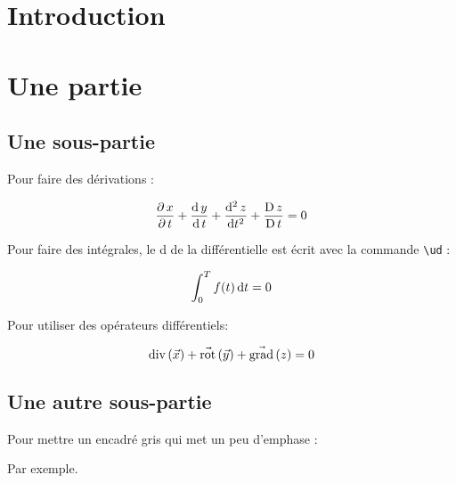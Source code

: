 \documentclass[a4paper,12pt,french]{article}
\begin{document}

\thispagestyle{empty}
\tableofcontents
\newpage


\section{Introduction}

\lipsum[1]





\newpage
\section{Une partie}
\subsection{Une sous-partie}


Pour faire des dérivations :

\[
    \dfrac{\partial\, x}{\partial\, t} + \dfrac{\mathrm{d}\, y}{\mathrm{d}\, t} + \dfrac{\mathrm{d}^2\, z}{\mathrm{d} t^2} + \dfrac{\mathrm{D}\, z}{\mathrm{D}\, t} = 0
\]



Pour faire des intégrales, le d de la différentielle est écrit avec la commande \texttt{\textbackslash ud} :

\[
    \int_0^T f(t) \, \mathrm{d} t = 0
\]



Pour utiliser des opérateurs différentiels:

\[
    \mathrm{div}\left( \vec{x} \right) + \vec{\mathrm{rot}}\left( \vec{y} \right) + \vec{\mathrm{grad}}\left( z \right) = 0
\]


\subsection{Une autre sous-partie}

Pour mettre un encadré gris qui met un peu d'emphase :

\begin{cadregris}

Par exemple.

\end{cadregris}
\end{document}
